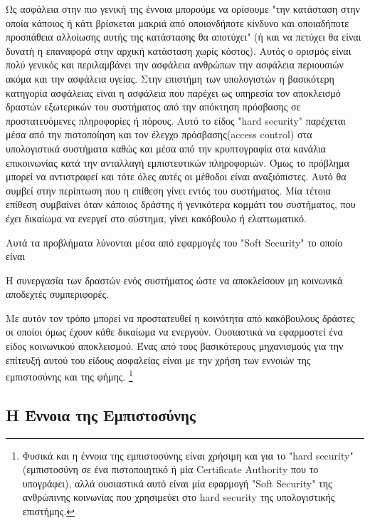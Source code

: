 Ως ασφάλεια στην πιο γενική της έννοια μπορούμε να ορίσουμε "την κατάσταση στην οποία κάποιος ή κάτι βρίσκεται μακριά από οποιονδήποτε κίνδυνο και οποιαδήποτε προσπάθεια αλλοίωσης αυτής της κατάστασης θα αποτύχει" (ή και να πετύχει θα είναι δυνατή η επαναφορά στην αρχική κατάσταση χωρίς κόστος). Αυτός ο ορισμός είναι πολύ γενικός και περιλαμβάνει την ασφάλεια ανθρώπων την ασφάλεια περιουσιών ακόμα και την ασφάλεια υγείας.
\newpage
Στην επιστήμη των υπολογιστών η βασικότερη κατηγορία ασφάλειας είναι η ασφάλεια που παρέχει ως υπηρεσία τον αποκλεισμό δραστών εξωτερικών του συστήματος από την απόκτηση πρόσβασης σε προστατευόμενες πληροφορίες ή πόρους. Αυτό το είδος "hard security" παρέχεται μέσα από την πιστοποίηση και τον έλεγχο πρόσβασης(access control) στα υπολογιστικά συστήματα καθώς και μέσα από την κρυπτογραφία στα κανάλια επικοινωνίας κατά την ανταλλαγή εμπιστευτικών πληροφοριών. Όμως το πρόβλημα μπορεί να αντιστραφεί και τότε όλες αυτές οι μέθοδοι είναι αναξιόπιστες. Αυτό θα συμβεί στην περίπτωση που η επίθεση γίνει εντός του συστήματος. Μία τέτοια επίθεση συμβαίνει όταν κάποιος δράστης ή γενικότερα κομμάτι του συστήματος, που έχει δικαίωμα να ενεργεί στο σύστημα, γίνει κακόβουλο ή ελαττωματικό. 

Αυτά τα προβλήματα λύνονται μέσα από εφαρμογές του "Soft Security" το οποίο είναι 

\begin{soft_sec}
Η συνεργασία των δραστών ενός συστήματος ώστε να αποκλείσουν μη κοινωνικά αποδεχτές συμπεριφορές. 
\end{soft_sec}

Με αυτόν τον τρόπο μπορεί να προστατευθεί η κοινότητα από κακόβουλους δράστες οι οποίοι όμως έχουν κάθε δικαίωμα να ενεργούν. Ουσιαστικά να εφαρμοστεί ένα είδος κοινωνικού αποκλεισμού. Ένας από τους βασικότερους μηχανισμούς για την επίτευξή αυτού του είδους ασφαλείας είναι με την χρήση των εννοιών της εμπιστοσύνης και της φήμης. \footnote{Φυσικά και η έννοια της εμπιστοσύνης είναι χρήσιμη και για το "hard security" (εμπιστοσύνη σε ένα πιστοποιητικό ή μία Certificate Authority που το υπογράφει), αλλά ουσιαστικά αυτό είναι μία εφαρμογή "Soft Security" της ανθρώπινης κοινωνίας που χρησιμεύει στο hard security της υπολογιστικής επιστήμης.} 



\subsection{Η Έννοια της Εμπιστοσύνης}

